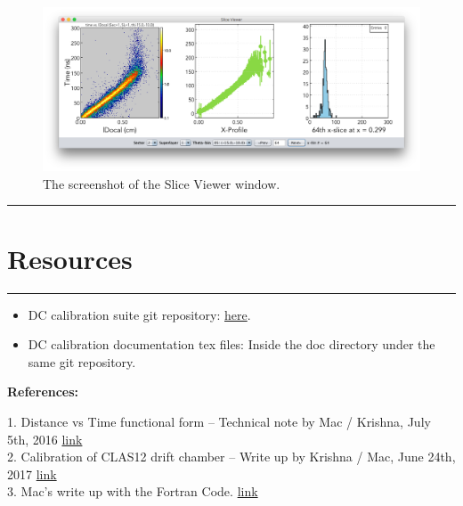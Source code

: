 \documentclass[12pt]{article}
\begin{document}
\begin{figure} [H] %
    \centering
    \includegraphics[width=1.0\textwidth]{Figures/Screenshots/screenShotSliceViewer.png}
    \caption{The screenshot of the Slice Viewer window.}
    \label{fSliceViewer}
\end{figure}


\newpage
{\color{black} \rule{\linewidth}{0.75mm} }
\section{Resources}
{\color{black} \rule{\linewidth}{0.75mm} }
\begin{itemize}

\item DC calibration suite git repository: \href{https://github.com/JeffersonLab/clas12calibration-dc}{here}.
\item DC calibration documentation tex files: Inside the doc directory under the same git repository.

\end{itemize}



\textbf{References:}

1. Distance vs Time functional form -- Technical note by Mac / Krishna, July 5th, 2016 \href{https://clasweb.jlab.org/wiki/images/f/f9/Tvsx-function.pdf}{link}\\
2. Calibration of CLAS12 drift chamber -- Write up by Krishna / Mac, June 24th, 2017 \href{https://userweb.jlab.org/%7Eadhikari/CLAS12software/DC/Released/dcCalibration.pdf}{link}\\
3. Mac's write up with the Fortran Code. \href{https://clasweb.jlab.org/wiki/images/8/81/Txfunc-parameters.txt}{link} 


      
\end{document}
